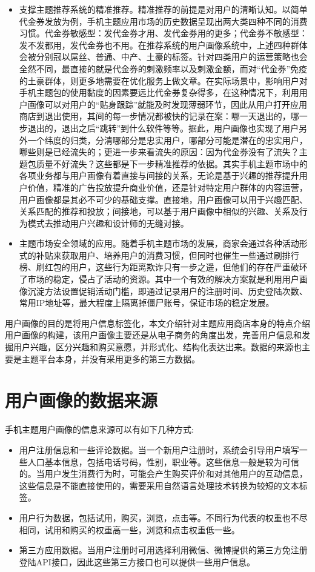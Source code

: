 \begin{itemize}
\item 支撑主题推荐系统的精准推荐。精准推荐的前提是对用户的清晰认知。以简单代金券发放为例，手机主题应用市场的历史数据呈现出两大类四种不同的消费习惯。代金券敏感型：发代金券才用、发代金券用的更多；代金券不敏感型：发不发都用，发代金券也不用。在推荐系统的用户画像系统中，上述四种群体会被分别冠以屌丝、普通、中产、土豪的标签。针对四类用户的运营策略也会全然不同，最直接的就是代金券的刺激频率以及刺激金额，而对“代金券”免疫的土豪群体，则更多地需要在优化服务上做文章。在实际场景中，影响用户对手机主题包的使用黏度的因素要远比代金券复杂得多，在这种情况下，利用用户画像可以对用户的“贴身跟踪”就能及时发现薄弱环节，因此从用户打开应用商店到退出使用，其间的每一步情况都被快的记录在案：哪一天退出的，哪一步退出的，退出之后“跳转”到什么软件等等。据此，用户画像也实现了用户另外一个纬度的归类，分清哪部分是忠实用户，哪部分可能是潜在的忠实用户，哪些则是已经流失的；更进一步来看流失的原因：因为代金券没有了流失？主题包质量不好流失？这些都是下一步精准推荐的依据。其实手机主题市场中的各项业务都与用户画像有着直接与间接的关系，无论是基于兴趣的推荐提升用户价值，精准的广告投放提升商业价值，还是针对特定用户群体的内容运营，用户画像都是其必不可少的基础支撑。直接地，用户画像可以用于兴趣匹配、关系匹配的推荐和投放；间接地，可以基于用户画像中相似的兴趣、关系及行为模式去推动用户兴趣和设计师的无缝对接。
\item 主题市场安全领域的应用。随着手机主题市场的发展，商家会通过各种活动形式的补贴来获取用户、培养用户的消费习惯，但同时也催生一些通过刷排行榜、刷红包的用户，这些行为距离欺诈只有一步之遥，但他们的存在严重破环了市场的稳定，侵占了活动的资源。其中一个有效的解决方案就是利用用户画像沉淀方法设置促销活动门槛，即通过记录用户的注册时间、历史登陆次数、常用IP地址等，最大程度上隔离掉僵尸账号，保证市场的稳定发展。
\end{itemize}

用户画像的目的是将用户信息标签化，本文介绍针对主题应用商店本身的特点介绍用户画像的构建，该用户画像主要还是从电子商务的角度出发，完善用户信息和发掘用户兴趣，区分兴趣和购买意愿，并形式化、结构化表达出来。数据的来源也主要是主题平台本身，并没有采用更多的第三方数据。

    \section{用户画像的数据来源}
    手机主题用户画像的信息来源可以有如下几种方式:
    \begin{itemize}
    \item 用户注册信息和一些评论数据。当一个新用户注册时，系统会引导用户填写一些人口基本信息，包括电话号码，性别，职业等。这些信息一般是较为可信的。当用户发生消费行为时，可能会产生购买评价和对其他用户的互动信息，这些信息是不能直接使用的，需要采用自然语言处理技术转换为较短的文本标签。
    \item 用户行为数据，包括试用，购买，浏览，点击等。不同行为代表的权重也不尽相同，试用和购买的权重高一些，浏览和点击权重低一些。
    \item 第三方应用数据。当用户注册时可用选择利用微信、微博提供的第三方免注册登陆API接口，因此这些第三方接口也可以提供一些用户信息。
    \end{itemize}

